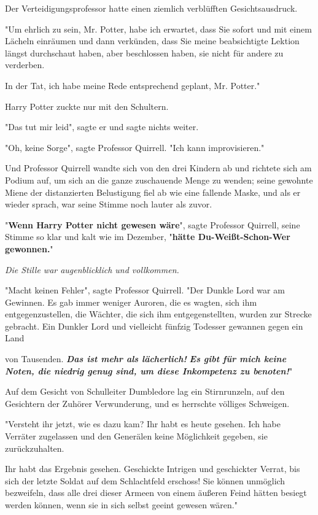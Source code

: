 {Der Verteidigungsprofessor hatte einen ziemlich verblüfften Gesichtsausdruck.

"Um ehrlich zu sein, Mr. Potter, habe ich erwartet, dass Sie sofort und mit einem Lächeln einräumen und dann verkünden, dass Sie meine beabsichtigte Lektion längst durchschaut haben, aber beschlossen haben, sie nicht für andere zu verderben.

In der Tat, ich habe meine Rede entsprechend geplant, Mr. Potter."

Harry Potter zuckte nur mit den Schultern.

"Das tut mir leid", sagte er und sagte nichts weiter.

"Oh, keine Sorge", sagte Professor Quirrell. "Ich kann improvisieren."

Und Professor Quirrell wandte sich von den drei Kindern ab und richtete sich am Podium auf, um sich an die ganze zuschauende Menge zu wenden; seine gewohnte Miene der distanzierten Belustigung fiel ab wie eine fallende Maske, und als er wieder sprach, war seine Stimme noch lauter als zuvor.

"\textbf{Wenn Harry Potter nicht gewesen wäre}", sagte Professor Quirrell, seine Stimme so klar und kalt wie im Dezember, "\textbf{hätte Du-Weißt-Schon-Wer gewonnen.}"

\emph{Die Stille war augenblicklich und vollkommen.}

"Macht keinen Fehler", sagte Professor Quirrell. "Der Dunkle Lord war am Gewinnen. Es gab immer weniger Auroren, die es wagten, sich ihm entgegenzustellen, die Wächter, die sich ihm entgegenstellten, wurden zur Strecke gebracht. Ein Dunkler Lord und vielleicht fünfzig Todesser gewannen gegen ein Land

von Tausenden. \textbf{\emph{Das ist mehr als lächerlich!}} \textbf{\emph{Es gibt für mich keine Noten, die niedrig genug sind, um diese Inkompetenz zu benoten!}}"

Auf dem Gesicht von Schulleiter Dumbledore lag ein Stirnrunzeln, auf den Gesichtern der Zuhörer Verwunderung, und es herrschte völliges Schweigen.

"Versteht ihr jetzt, wie es dazu kam? Ihr habt es heute gesehen. Ich habe Verräter zugelassen und den Generälen keine Möglichkeit gegeben, sie zurückzuhalten.

Ihr habt das Ergebnis gesehen. Geschickte Intrigen und geschickter Verrat, bis sich der letzte Soldat auf dem Schlachtfeld erschoss! Sie können unmöglich bezweifeln, dass alle drei dieser Armeen von einem äußeren Feind hätten besiegt werden können, wenn sie in sich selbst geeint gewesen wären."

}
